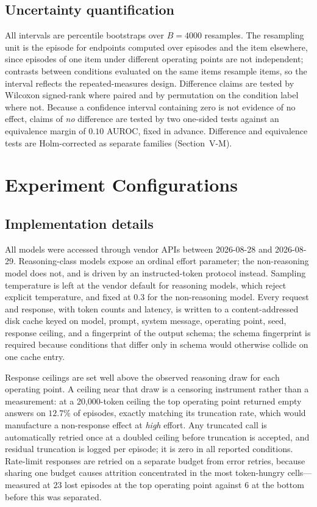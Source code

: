 \documentclass[journal,twoside]{IEEEtran}
\begin{document}
\subsection{Uncertainty quantification}
All intervals are percentile bootstraps over $B=4000$ resamples. The resampling unit is the episode
for endpoints computed over episodes and the item elsewhere, since episodes of one item under
different operating points are not independent; contrasts between conditions evaluated on the same
items resample items, so the interval reflects the repeated-measures design. Difference claims are
tested by Wilcoxon signed-rank where paired and by permutation on the condition label where not.
Because a confidence interval containing zero is not evidence of no effect, claims of \emph{no}
difference are tested by two one-sided tests against an equivalence margin of $0.10$ AUROC, fixed in
advance. Difference and equivalence tests are Holm-corrected as separate families
(Section~V-M).

\section{Experiment Configurations}

\subsection{Implementation details}
All models were accessed through vendor APIs between 2026-08-28 and 2026-08-29. Reasoning-class
models expose an ordinal effort parameter; the non-reasoning model does not, and is driven by an
instructed-token protocol instead. Sampling temperature is left at the vendor default for reasoning
models, which reject explicit temperature, and fixed at $0.3$ for the non-reasoning model. Every
request and response, with token counts and latency, is written to a content-addressed disk cache
keyed on model, prompt, system message, operating point, seed, response ceiling, and a fingerprint of
the output schema; the schema fingerprint is required because conditions that differ only in schema
would otherwise collide on one cache entry.

Response ceilings are set well above the observed reasoning draw for each operating point. A ceiling
near that draw is a censoring instrument rather than a measurement: at a 20{,}000-token ceiling the
top operating point returned empty answers on $12.7\%$ of episodes, exactly matching its truncation
rate, which would manufacture a non-response effect at \emph{high} effort. Any truncated call is
automatically retried once at a doubled ceiling before truncation is accepted, and residual
truncation is logged per episode; it is zero in all reported conditions. Rate-limit responses are
retried on a separate budget from error retries, because sharing one budget causes attrition
concentrated in the most token-hungry cells---measured at $23$ lost episodes at the top operating
point against $6$ at the bottom before this was separated.
\end{document}
